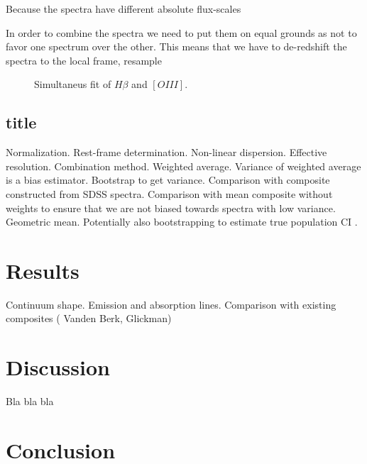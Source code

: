 \documentclass[iop]{emulateapj}
\begin{document}
Because the spectra have different absolute flux-scales 

In order to combine the spectra we need to put them on equal grounds as not to favor one spectrum over the other. This means that we have to de-redshift the spectra to the local frame, resample 

\begin{figure}
\caption{Simultaneus fit of $H\beta$ and $[OIII]$.\label{fig3}}
\end{figure}






\subsection{title}

Normalization.
Rest-frame determination.
Non-linear dispersion. 
Effective resolution.
Combination method. Weighted average. Variance of weighted average is a bias estimator. Bootstrap to get variance. Comparison with composite constructed from SDSS spectra. Comparison with mean composite without weights to ensure that we are not biased towards spectra with low variance. Geometric mean. Potentially also bootstrapping to estimate true population CI
. 
\section{Results}
Continuum shape. Emission and absorption lines. Comparison with existing composites ( Vanden Berk, Glickman)
\section{Discussion}
Bla bla bla
\section{Conclusion}


%
%
%
%

\end{document}
